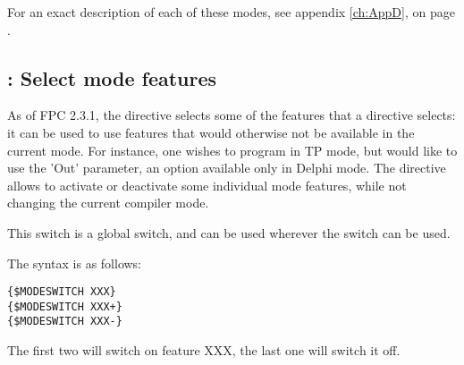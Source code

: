For an exact description of each of these modes, see appendix \ref{ch:AppD},
on page \pageref{ch:AppD}.

\subsection{ : Select mode features}
As of FPC 2.3.1, the  directive selects some of the features that a
 directive selects: it can be used to use features that
would otherwise not be available in the current mode. For instance, one
wishes to program in TP mode, but would like to use the 'Out' parameter,
an option available only in Delphi mode. The 
directive allows to activate or deactivate some individual mode features, 
while not changing the current compiler mode.

This switch is a global switch, and can be used wherever the 
switch can be used.

The syntax is as follows:
\begin{verbatim}
{$MODESWITCH XXX}
{$MODESWITCH XXX+}
{$MODESWITCH XXX-}
\end{verbatim}
The first two will switch on feature XXX, the last one will switch it off.

